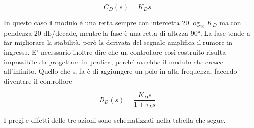 	   		\begin{equation*}
	   			C_D(s)=K_Ds
	   		\end{equation*} 
	   		
	   		\noindent In questo caso il modulo è una retta sempre con intercetta $20\log_{10}K_D$ ma con pendenza $20$ dB/decade, mentre la fase è una retta di altezza $90°$. La fase tende a far migliorare la stabilità, però la derivata del segnale amplifica il rumore in ingresso. E' necessario inoltre dire che un controllore così costruito risulta impossibile da progettare in pratica, perché avrebbe il modulo che cresce all'infinito. Quello che si fa è di aggiungere un polo in alta frequenza, facendo diventare il controllore
	   		
	   		\begin{equation*}
	   			D_D(s)=\frac{K_Ds}{1+\tau_Ls}
	   		\end{equation*} 	 
	
		\noindent I pregi e difetti delle tre azioni sono schematizzati nella tabella che segue.	
	
